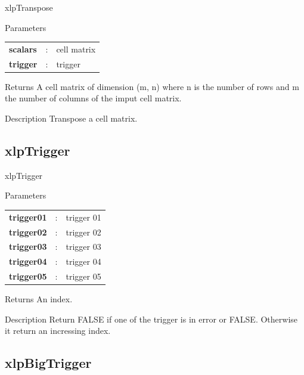 \begin{xlpfunctitle}{xlpTranspose}

\begin{xlpfunc}{Parameters}
\begin{tabular}{p{3.5cm}cl}
\textbf{scalars}& : & cell matrix \\
\textbf{trigger}& : & trigger 
\end{tabular}
\end{xlpfunc}


\begin{xlpfunc}{Returns}
A cell matrix of dimension (m, n) where n is the number of rows and m the number of columns of the imput cell matrix.
\end{xlpfunc}

\begin{xlpfunc}{Description}
Transpose a cell matrix.
\end{xlpfunc}
\end{xlpfunctitle}




\subsection{xlpTrigger}

\begin{xlpfunctitle}{xlpTrigger}

\begin{xlpfunc}{Parameters}
\begin{tabular}{p{3.5cm}cl}
\textbf{trigger01}& : & trigger 01 \\
\textbf{trigger02}& : & trigger 02 \\
\textbf{trigger03}& : & trigger 03 \\
\textbf{trigger04}& : & trigger 04 \\
\textbf{trigger05}& : & trigger 05 \\
\end{tabular}
\end{xlpfunc}


\begin{xlpfunc}{Returns}
An index.
\end{xlpfunc}

\begin{xlpfunc}{Description}
Return FALSE if one of the trigger is in error or FALSE. Otherwise it return an incressing index.
\end{xlpfunc}
\end{xlpfunctitle}

\subsection{xlpBigTrigger}

